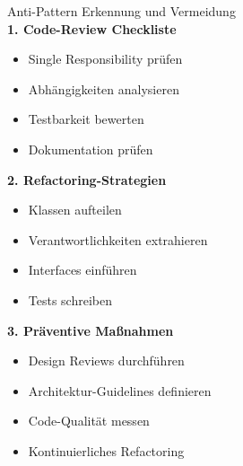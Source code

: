 \begin{KR}{Anti-Pattern Erkennung und Vermeidung}\\
\textbf{1. Code-Review Checkliste}
\begin{itemize}
    \item Single Responsibility prüfen
    \item Abhängigkeiten analysieren
    \item Testbarkeit bewerten
    \item Dokumentation prüfen
\end{itemize}

\textbf{2. Refactoring-Strategien}
\begin{itemize}
    \item Klassen aufteilen
    \item Verantwortlichkeiten extrahieren
    \item Interfaces einführen
    \item Tests schreiben
\end{itemize}

\textbf{3. Präventive Maßnahmen}
\begin{itemize}
    \item Design Reviews durchführen
    \item Architektur-Guidelines definieren
    \item Code-Qualität messen
    \item Kontinuierliches Refactoring
\end{itemize}
\end{KR}

